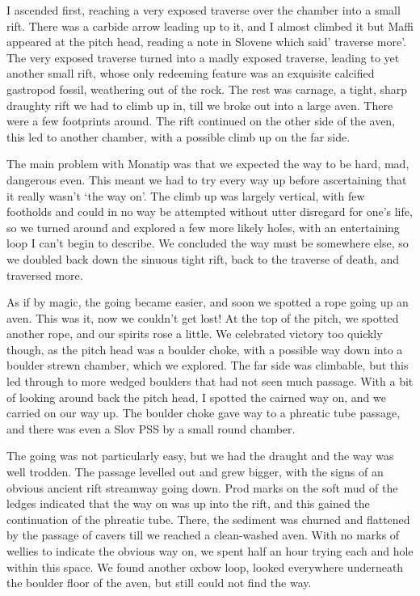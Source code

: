 I ascended first, reaching a very exposed traverse over the chamber into a small rift. There was a carbide arrow leading up to it, and I almost climbed it but Maffi appeared at the pitch head, reading a note in Slovene which said’ traverse more’. The very exposed traverse turned into a madly exposed traverse, leading to yet another small rift, whose only redeeming feature was an exquisite calcified gastropod fossil, weathering out of the rock. The rest was carnage, a tight, sharp draughty rift we had to climb up in, till we broke out into a large aven. There were a few footprints around. The rift continued on the other side of the aven, this led to another chamber, with a possible climb up on the far side. 

The main problem with Monatip was that we expected the way to be hard, mad, dangerous even. This meant we had to try every way up before ascertaining that it really wasn’t ‘the way on’. The climb up was largely vertical, with few footholds and could in no way be attempted without utter disregard for one’s life, so we turned around and explored a few more likely holes, with an entertaining loop I can’t begin to describe. We concluded the way must be somewhere else, so we doubled back down the sinuous tight rift, back to the traverse of death, and traversed more.

As if by magic, the going became easier, and soon we spotted a rope going up an aven. This was it, now we couldn’t get lost! At the top of the pitch, we spotted another rope, and our spirits rose a little. We celebrated victory too quickly though, as the pitch head was a boulder choke, with a possible way down into a boulder strewn  chamber, which we explored. The far side was climbable, but this led through to more wedged boulders that had not seen much passage. With a bit of looking around back the pitch head, I spotted the cairned way on, and we carried on our way up. The boulder choke gave way to a phreatic tube passage, and there was even a Slov PSS by a small round chamber. 

The going was not particularly easy, but we had the draught and the way was well trodden. The passage levelled out and grew bigger, with the signs of an obvious ancient rift streamway going down. Prod marks on the soft mud of the ledges indicated that the way on was up into the rift, and this gained the continuation of the phreatic tube. There, the sediment was churned and flattened by the passage of cavers till we reached a clean-washed aven. With no marks of wellies to indicate the obvious way on, we spent half an hour trying each and hole within this space. We found another oxbow loop, looked everywhere underneath the boulder floor of the aven, but still could not find the way. 

